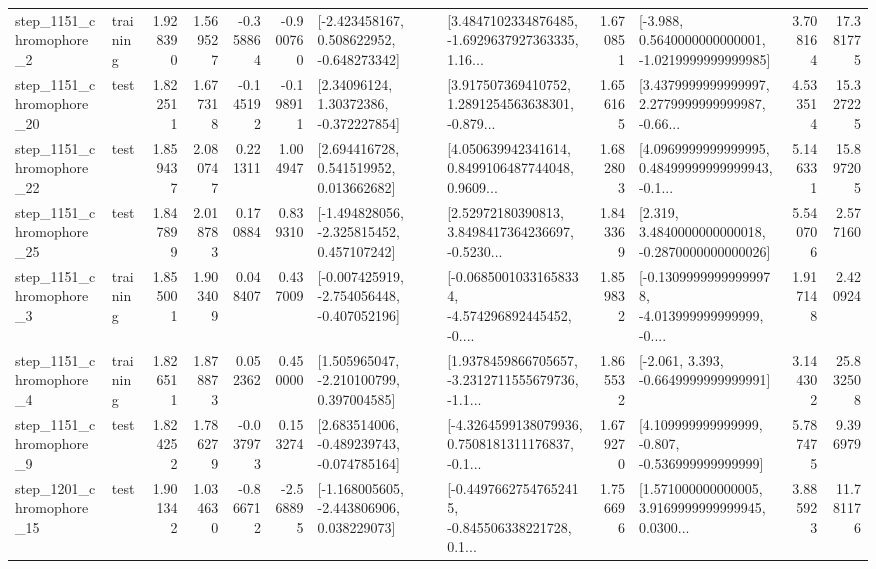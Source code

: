\begin{tabular}{llrrrrllrlrr}
  step\_1151\_chromophore\_2 &  training &      1.928390 &    1.569527 &     -0.358864 & -0.900760 &   [-2.423458167, 0.508622952, -0.648273342] &  [3.4847102334876485, -1.6929637927363335, 1.16... &       1.670851 &  [-3.988, 0.5640000000000001, -1.0219999999999985] &            3.708164 &         17.381775 \\
 step\_1151\_chromophore\_20 &      test &      1.822511 &    1.677318 &     -0.145192 & -0.198911 &      [2.34096124, 1.30372386, -0.372227854] &  [3.917507369410752, 1.2891254563638301, -0.879... &       1.656165 &  [3.4379999999999997, 2.2779999999999987, -0.66... &            4.533514 &         15.327225 \\
 step\_1151\_chromophore\_22 &      test &      1.859437 &    2.080747 &      0.221311 &  1.004947 &     [2.694416728, 0.541519952, 0.013662682] &  [4.050639942341614, 0.8499106487744048, 0.9609... &       1.682803 &  [4.0969999999999995, 0.48499999999999943, -0.1... &            5.146331 &         15.897205 \\
 step\_1151\_chromophore\_25 &      test &      1.847899 &    2.018783 &      0.170884 &  0.839310 &   [-1.494828056, -2.325815452, 0.457107242] &  [2.52972180390813, 3.8498417364236697, -0.5230... &       1.843369 &   [2.319, 3.4840000000000018, -0.2870000000000026] &            5.540706 &          2.577160 \\
  step\_1151\_chromophore\_3 &  training &      1.855001 &    1.903409 &      0.048407 &  0.437009 &  [-0.007425919, -2.754056448, -0.407052196] &  [-0.06850010331658334, -4.574296892445452, -0.... &       1.859832 &  [-0.13099999999999978, -4.013999999999999, -0.... &            1.917148 &          2.420924 \\
  step\_1151\_chromophore\_4 &  training &      1.826511 &    1.878873 &      0.052362 &  0.450000 &    [1.505965047, -2.210100799, 0.397004585] &  [1.9378459866705657, -3.2312711555679736, -1.1... &       1.865532 &               [-2.061, 3.393, -0.6649999999999991] &            3.144302 &         25.832508 \\
  step\_1151\_chromophore\_9 &      test &      1.824252 &    1.786279 &     -0.037973 &  0.153274 &   [2.683514006, -0.489239743, -0.074785164] &  [-4.3264599138079936, 0.7508181311176837, -0.1... &       1.679270 &    [4.109999999999999, -0.807, -0.536999999999999] &            5.787475 &          9.396979 \\
 step\_1201\_chromophore\_15 &      test &      1.901342 &    1.034630 &     -0.866712 & -2.568895 &   [-1.168005605, -2.443806906, 0.038229073] &  [-0.44976627547652415, -0.845506338221728, 0.1... &       1.756696 &  [1.571000000000005, 3.9169999999999945, 0.0300... &            3.885923 &         11.781176 \\

\end{tabular}
